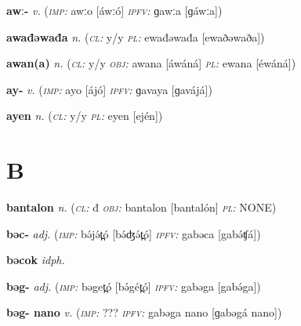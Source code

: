 \newentry
\headword\textbf{awː-}
\ipa{[áwː-]}
\synpos\textit{v.} 
\imperative(\textit {\textsc{imp:}} awːo [áwːó] 
\imperfective\textit{\textsc{ipfv:}} ɡawːa [ɡáwːa])

\newentry
\headword\textbf{awađəwađa}
\ipa{[awaðəwaða]}
\synpos\textit{n.} 
\class(\textit{\textsc{cl:}} {y/y}
\plural\textit{\textsc{pl:}} ewađəwađa [ewaðəwaða])

\newentry
\headword\textbf{awan(a)}
\ipa{[áwán(á)]}
\synpos\textit{n.} 
\class(\textit{\textsc{cl:}} {y/y}
\object\textit{\textsc{obj:}} awana [áwáná]
\plural\textit{\textsc{pl:}} ewana [éwáná])

\newentry
\headword\textbf{ay-}
\ipa{[áj-]}
\synpos\textit{v.} 
\imperative(\textit {\textsc{imp:}} ayo [ájó] 
\imperfective\textit{\textsc{ipfv:}} ɡavaya [ɡavájá])

\newentry
\headword\textbf{ayen}
\ipa{[ajén]}
\synpos\textit{n.} 
\class(\textit{\textsc{cl:}} {y/y}
\plural\textit{\textsc{pl:}} eyen [ején])


\section*{B}\label{B}

\newentry
\headword\textbf{bantalon} 
\ipa{[bantalón]} 
\synpos\textit{n.} 
\class(\textit{\textsc{cl:}} {đ}
\object\textit{\textsc{obj:}} bantalon [bantalón]
\plural\textit{\textsc{pl:}} NONE)  

\newentry
\headword\textbf{bəc-}
\ipa{[bə́tʃ-]}
\synpos\textit{adj.} 
\imperative(\textit {\textsc{imp:}} bə́jə́t̪ó [bə́ʤə́t̪ó] 
\imperfective\textit{\textsc{ipfv:}} gabəca [gabə́ʧá])

\newentry
\headword\textbf{bəcok} 
\ipa{[bətʃok]} 
\synpos\textit{idph.} 

\newentry
\headword\textbf{bəg-}
\ipa{[bə́g-]}
\synpos\textit{adj.} 
\imperative(\textit {\textsc{imp:}} bəget̪ó [bə́gét̪ó] 
\imperfective\textit{\textsc{ipfv:}} gabəga [gabə́ga])

\newentry
\headword\textbf{bəg- nano}
\ipa{[bə́g- nano]}
\synpos\textit{v.} 
\imperative(\textit {\textsc{imp:}} ??? %
\imperfective\textit{\textsc{ipfv:}} gabəga nano [ɡabəgá nano])

